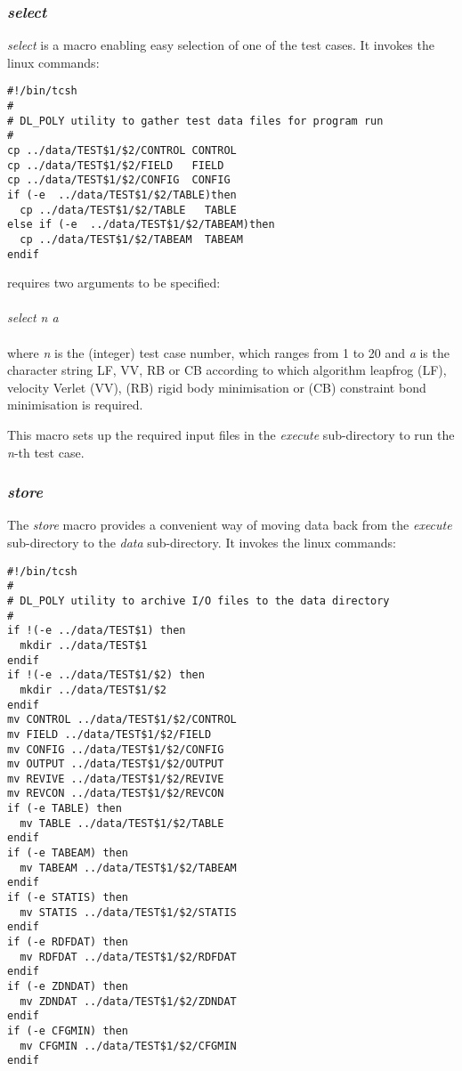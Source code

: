 \subsubsection{{\sl select}}

{\sl select} is a macro enabling easy selection of one of the test
cases. It invokes the linux commands:

\begin{verbatim}
#!/bin/tcsh
#
# DL_POLY utility to gather test data files for program run
#
cp ../data/TEST$1/$2/CONTROL CONTROL
cp ../data/TEST$1/$2/FIELD   FIELD
cp ../data/TEST$1/$2/CONFIG  CONFIG
if (-e  ../data/TEST$1/$2/TABLE)then
  cp ../data/TEST$1/$2/TABLE   TABLE
else if (-e  ../data/TEST$1/$2/TABEAM)then
  cp ../data/TEST$1/$2/TABEAM  TABEAM
endif
\end{verbatim}
 requires two arguments to be specified:\\~\\
{\sl select n a}\\~\\
\noindent where {\sl n} is the (integer) test case number, which
ranges from 1 to 20 and {\sl a} is the character string LF, VV, RB or
CB according to which algorithm leapfrog (LF), velocity Verlet (VV),
(RB) rigid body minimisation or (CB) constraint bond minimisation is
required.

This macro sets up the required input files in the {\em execute}
sub-directory to run the {\sl n}-th test case.

\subsubsection{{\sl store}}

The {\sl store} macro provides a convenient way of moving data back
from the {\em execute} sub-directory to the {\em
data} sub-directory. It invokes the linux
commands:

\begin{verbatim}
#!/bin/tcsh
#
# DL_POLY utility to archive I/O files to the data directory
#
if !(-e ../data/TEST$1) then
  mkdir ../data/TEST$1
endif
if !(-e ../data/TEST$1/$2) then
  mkdir ../data/TEST$1/$2
endif
mv CONTROL ../data/TEST$1/$2/CONTROL
mv FIELD ../data/TEST$1/$2/FIELD
mv CONFIG ../data/TEST$1/$2/CONFIG
mv OUTPUT ../data/TEST$1/$2/OUTPUT
mv REVIVE ../data/TEST$1/$2/REVIVE
mv REVCON ../data/TEST$1/$2/REVCON
if (-e TABLE) then
  mv TABLE ../data/TEST$1/$2/TABLE
endif
if (-e TABEAM) then
  mv TABEAM ../data/TEST$1/$2/TABEAM
endif
if (-e STATIS) then
  mv STATIS ../data/TEST$1/$2/STATIS
endif
if (-e RDFDAT) then
  mv RDFDAT ../data/TEST$1/$2/RDFDAT
endif
if (-e ZDNDAT) then
  mv ZDNDAT ../data/TEST$1/$2/ZDNDAT
endif
if (-e CFGMIN) then
  mv CFGMIN ../data/TEST$1/$2/CFGMIN
endif
\end{verbatim}

